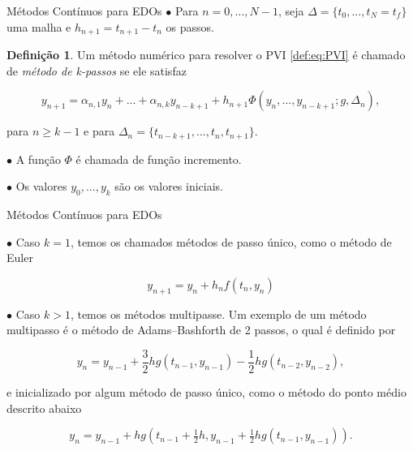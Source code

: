 \documentclass{beamer}
\theoremstyle{plain}
\theoremstyle{definition}
\newtheorem{defi}{Definição}
\begin{document}
\begin{frame}{Métodos Contínuos para EDOs}
    \small
    \phantom{aa} $\bullet$ Para $n = 0, ..., N-1$, seja $\Delta = \{ t_0, ..., t_N = t_f\}$ uma malha e $h_{n+1} = t_{n+1} - t_n$ os passos.

    \begin{defi}
        Um método numérico para resolver o PVI \eqref{def:eq:PVI} é chamado de \textit{método de k-passos} se ele satisfaz 

        \begin{equation}
            y_{n+1} = \alpha_{n, 1} y_n + ... + \alpha_{n, k} y_{n - k + 1} + h_{n+1} \Phi( y_n, ..., y_{n-k+1}; g, \Delta_n), 
            \label{chap3:def:eq:ODE_method}
        \end{equation}

        para $n \geq k - 1$ e para $\Delta_n = \{ t_{n - k + 1}, ..., t_n, t_{n+1}\} $.

    \end{defi}

    \phantom{aa} $\bullet$ A função $\Phi$ é chamada de função incremento.

    \phantom{aa} $\bullet$ Os valores $y_0, ..., y_k$ são os valores iniciais.



\end{frame}


\begin{frame}{Métodos Contínuos para EDOs}

    \phantom{aa} $\bullet$ Caso $k = 1$, temos os chamados métodos de passo único, como o método de Euler 

    \[
        y_{n+1} = y_n + h_n f(t_n, y_n)
    \]

    \phantom{aa} $\bullet$ Caso $k > 1$, temos os métodos multipasse. Um exemplo de um método multipasso é o método de Adams–Bashforth de 2 passos, o qual é definido por 

    \[
        y_{n} = y_{n-1} + \frac{3}{2} h g(t_{n-1},y_{n-1}) - \frac{1}{2} hg(t_{n-2},y_{n-2}),
    \]

    \noindent
    e  inicializado por algum método de passo único, como o método do ponto médio descrito abaixo

    \[
        y_{n}=y_{n-1}+hg\left(t_{n-1}+{\tfrac {1}{2}}h,y_{n-1}+{\tfrac {1}{2}}hg(t_{n-1},y_{n-1})\right).
    \]
\end{frame}
\end{document}
